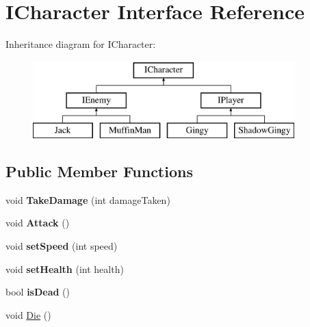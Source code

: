 \hypertarget{interface_i_character}{}\section{I\+Character Interface Reference}
\label{interface_i_character}
Inheritance diagram for I\+Character\+:\begin{figure}[H]
\begin{center}
\leavevmode
\includegraphics[height=3.000000cm]{interface_i_character}
\end{center}
\end{figure}
\subsection*{Public Member Functions}
\begin{DoxyCompactItemize}
\item 
\mbox{\label{interface_i_character_a5ff82ed63ab6c5f142ee2222f1e7164b}} 
void {\bfseries Take\+Damage} (int damage\+Taken)
\item 
\mbox{\label{interface_i_character_adeba1d21cd6df9251ae45eea19d47672}} 
void {\bfseries Attack} ()
\item 
\mbox{\label{interface_i_character_a3e5e2be6e9b94d6305c4f04ec7250af4}} 
void {\bfseries set\+Speed} (int speed)
\item 
\mbox{\label{interface_i_character_a8ba692ee17ea30254bebbafd74f0bea4}} 
void {\bfseries set\+Health} (int health)
\item 
\mbox{\label{interface_i_character_a62ddd177f869258efdcf171dd8284009}} 
bool {\bfseries is\+Dead} ()
\item 
void \mbox{\hyperlink{interface_i_character_ad58356e457f98d8a6f9548da446012ce}{Die}} ()
\end{DoxyCompactItemize}


